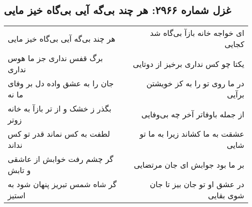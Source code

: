 \begin{center}
\section*{غزل شماره ۲۹۶۶: هر چند بی‌گه آیی بی‌گاه خیز مایی}
\label{sec:2966}
\begin{longtable}{l p{0.5cm} r}
هر چند بی‌گه آیی بی‌گاه خیز مایی
&&
ای خواجه خانه بازآ بی‌گاه شد کجایی
\\
برگ قفس نداری جز ما هوس نداری
&&
یکتا چو کس نداری برخیز از دوتایی
\\
جان را به عشق واده دل بر وفای ما نه
&&
در ما روی تو را به کز خویشتن برآیی
\\
بگذر ز خشک و از تر بازآ به خانه زوتر
&&
از جمله باوفاتر آخر چه بی‌وفایی
\\
لطفت به کس نماند قدر تو کس نداند
&&
عشقت به ما کشاند زیرا به ما تو شایی
\\
گر چشم رفت خوابش از عاشقی و تابش
&&
بر ما بود جوابش ای جان مرتضایی
\\
گر شاه شمس تبریز پنهان شود به استیز
&&
در عشق او تو جان بیز تا جان شوی بقایی
\\
\end{longtable}
\end{center}
